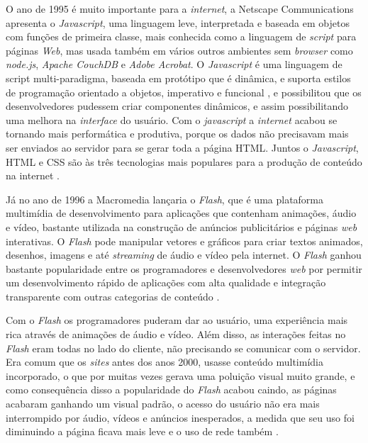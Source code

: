 O ano de 1995 é muito importante para a \textit{internet}, a Netscape Communications apresenta o \textit{Javascript}, uma linguagem leve, interpretada e baseada em objetos com funções de primeira classe, mais conhecida como a linguagem de \textit{script} para páginas \textit{Web}, mas usada também em vários outros ambientes sem \textit{browser} como \textit{node.js},  \textit{Apache CouchDB} e\textit{ Adobe Acrobat}. O \textit{Javascript} é uma linguagem de script multi-paradigma,  baseada em protótipo que é dinâmica, e suporta estilos de programação orientado a objetos, imperativo e funcional \cite{mozilla2018}, e possibilitou que os desenvolvedores pudessem criar componentes dinâmicos, e assim possibilitando uma melhora na \textit{interface} do usuário. Com o \textit{javascript} a \textit{internet} acabou se tornando mais performática e produtiva, porque os dados não precisavam mais ser enviados ao servidor para se gerar toda a página \ac{HTML}. Juntos o \textit{Javascript}, \ac{HTML} e \ac{CSS} são às três tecnologias mais populares para a produção de conteúdo na internet \cite{devsaran2018}.

Já no ano de 1996 a Macromedia lançaria o \textit{Flash}, que é uma plataforma multimídia de desenvolvimento para aplicações que contenham animações, áudio e vídeo, bastante utilizada na construção de anúncios publicitários e páginas \textit{web} interativas. O \textit{Flash} pode manipular vetores e gráficos para criar textos animados, desenhos, imagens e até \textit{streaming} de áudio e vídeo pela internet. 
O \textit{Flash} ganhou bastante popularidade entre os programadores e desenvolvedores \textit{web} por permitir um desenvolvimento rápido de aplicações com alta qualidade e integração transparente com outras categorias de conteúdo \cite{canaltechFlash2018}.

 Com o \textit{Flash} os programadores puderam dar ao usuário, uma experiência mais rica através de animações de áudio e vídeo. Além disso, as interações feitas no \textit{Flash} eram todas no lado do cliente, não precisando se comunicar com o servidor. Era comum que os \textit{sites} antes dos anos 2000, usasse conteúdo multimídia incorporado, o que por muitas vezes gerava uma poluição visual muito grande, e como consequência disso a popularidade do \textit{Flash} acabou caindo, as páginas acabaram ganhando um visual padrão, o acesso do usuário não era mais interrompido por áudio, vídeos e anúncios inesperados, a medida que seu uso foi diminuindo a página ficava mais leve e o uso de rede também \cite{devmediaAsync2018}.


